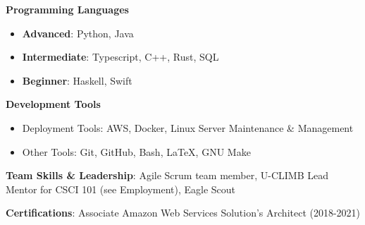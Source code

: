 \vspace{-2.0mm}


\begin{cventries}
\vspace{-5mm}
  \cventry
    {}
    {}
    {}
    {}
    {
      \begin{cvitems}
        \item {\textbf{Programming Languages}}
        \begin{itemize}
        \item \textbf{Advanced}: Python, Java
        \item \textbf{Intermediate}: Typescript, C++, Rust, SQL
        \item \textbf{Beginner}: Haskell, Swift
        \end{itemize}
        \item {\textbf{Development Tools}}
        \begin{itemize}
        \item {Deployment Tools: AWS, Docker, Linux Server Maintenance \& Management}
        \item {Other Tools: Git, GitHub, Bash, \LaTeX, GNU Make}
        \end {itemize}
        \item {\textbf{Team Skills \& Leadership}: Agile Scrum team
            member, U-CLIMB Lead Mentor for CSCI 101 (see Employment),
    Eagle Scout}
          \item {\textbf{Certifications}: Associate Amazon Web Services Solution's Architect (2018-2021)}
      \end{cvitems}
    }
    {}
\end{cventries}
